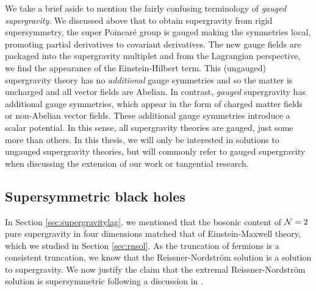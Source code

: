 We take a brief aside to mention the fairly confusing terminology of \emph{gauged supergravity}. We discussed above that to obtain supergravity from rigid supersymmetry, the super Poincar\'e group is gauged making the symmetries local, promoting partial derivatives to covariant derivatives. The new gauge fields are packaged into the supergravity multiplet and from the Lagrangian perspective, we find the appearance of the Einstein-Hilbert term. This (ungauged) supergravity theory has no \emph{additional} gauge symmetries and so the matter is uncharged and all vector fields are Abelian. In contrast, \emph{gauged} supergravity has additional gauge symmetries, which appear in the form of charged matter fields or non-Abelian vector fields. These additional gauge symmetries introduce a scalar potential. In this sense, all supergravity theories are gauged, just some more than others. In this thesis, we will only be interested in solutions to ungauged supergravity theories, but will commonly refer to gauged supergravity when discussing the extension of our work or tangential research.  

\subsection{Supersymmetric black holes}
\label{sec:supersymmetricblackhole}
In Section \ref{sec:supergravitylag}, we mentioned that the bosonic content of ${\cal N} = 2$ pure supergravity in four dimensions matched that of Einstein-Maxwell theory, which we studied in Section \ref{sec:rnsol}. As the truncation of fermions is a consistent truncation, we know that the Reissner-Nordstr\"om solution is a solution to supergravity. We now justify the claim that the extremal Reissner-Nordstr\"om solution is supersymmetric following a discussion in \cite{Mohaupt:2000gc}.

